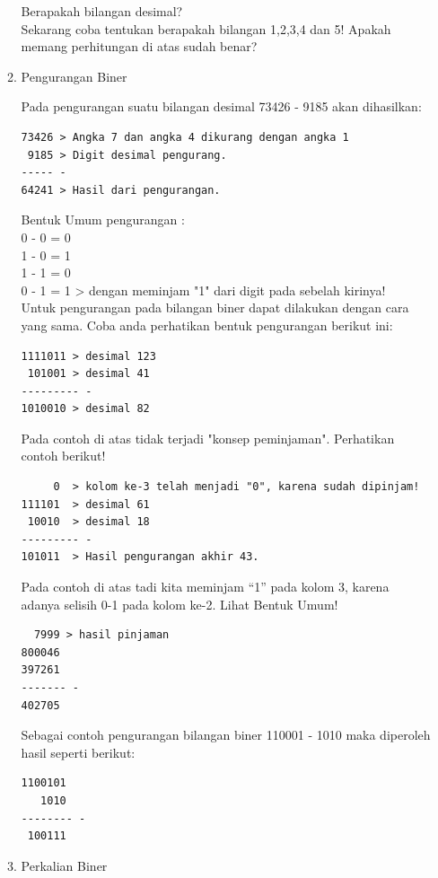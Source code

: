 \begin{enumerate}[label=(\alph*)]
\begin{enumerate}
Berapakah bilangan desimal? \\

Sekarang coba tentukan berapakah bilangan 1,2,3,4 dan 5! Apakah memang perhitungan di atas sudah benar? \\

\item Pengurangan Biner

\qquad Pada pengurangan suatu bilangan desimal 73426 - 9185 akan dihasilkan:
\begin{verbatim}
73426 > Angka 7 dan angka 4 dikurang dengan angka 1
 9185 > Digit desimal pengurang.
----- -
64241 > Hasil dari pengurangan.
\end{verbatim}

Bentuk Umum pengurangan : \\
0 - 0 = 0 \\
1 - 0 = 1 \\
1 - 1 = 0 \\
0 - 1 = 1 > dengan meminjam "1" dari digit pada sebelah kirinya! \\
 
\quad Untuk pengurangan pada bilangan biner dapat dilakukan dengan cara yang sama. Coba anda perhatikan bentuk pengurangan berikut ini:
\begin{verbatim}
1111011 > desimal 123
 101001 > desimal 41
--------- -
1010010 > desimal 82 
\end{verbatim}
\qquad Pada contoh di atas tidak terjadi "konsep peminjaman". Perhatikan contoh berikut!

\begin{verbatim}
     0  > kolom ke-3 telah menjadi "0", karena sudah dipinjam!
111101  > desimal 61
 10010  > desimal 18
--------- -
101011  > Hasil pengurangan akhir 43.
\end{verbatim}

\qquad Pada contoh di atas tadi kita meminjam “1” pada kolom 3, karena adanya selisih 0-1 pada kolom ke-2. Lihat Bentuk Umum!
\begin{verbatim}
  7999 > hasil pinjaman
800046
397261
------- -
402705
\end{verbatim}

\qquad Sebagai contoh pengurangan bilangan biner 110001 - 1010 maka diperoleh hasil seperti berikut:
\begin{verbatim}
1100101
   1010
-------- - 
 100111
\end{verbatim}

\item Perkalian Biner


\end{enumerate}
\end{enumerate}
